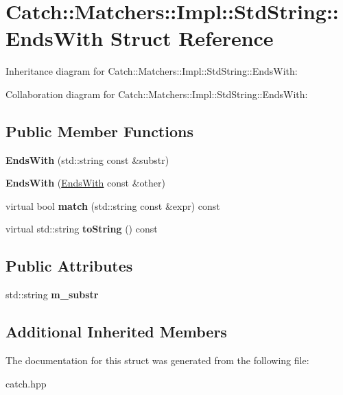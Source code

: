 \hypertarget{struct_catch_1_1_matchers_1_1_impl_1_1_std_string_1_1_ends_with}{}\section{Catch\+:\+:Matchers\+:\+:Impl\+:\+:Std\+String\+:\+:Ends\+With Struct Reference}
\label{struct_catch_1_1_matchers_1_1_impl_1_1_std_string_1_1_ends_with}


Inheritance diagram for Catch\+:\+:Matchers\+:\+:Impl\+:\+:Std\+String\+:\+:Ends\+With\+:


Collaboration diagram for Catch\+:\+:Matchers\+:\+:Impl\+:\+:Std\+String\+:\+:Ends\+With\+:
\subsection*{Public Member Functions}
\begin{DoxyCompactItemize}
\item 
\mbox{\label{struct_catch_1_1_matchers_1_1_impl_1_1_std_string_1_1_ends_with_a82730175f7f7475ce1ee9791e160d02d}} 
{\bfseries Ends\+With} (std\+::string const \&substr)
\item 
\mbox{\label{struct_catch_1_1_matchers_1_1_impl_1_1_std_string_1_1_ends_with_a9321aac07fb17613a7993e99003b3be2}} 
{\bfseries Ends\+With} (\hyperlink{struct_catch_1_1_matchers_1_1_impl_1_1_std_string_1_1_ends_with}{Ends\+With} const \&other)
\item 
\mbox{\label{struct_catch_1_1_matchers_1_1_impl_1_1_std_string_1_1_ends_with_aff66fb5af2d4f6161627cb20899b2c1b}} 
virtual bool {\bfseries match} (std\+::string const \&expr) const
\item 
\mbox{\label{struct_catch_1_1_matchers_1_1_impl_1_1_std_string_1_1_ends_with_a2a4675e3d2369d587af36f051fb7964f}} 
virtual std\+::string {\bfseries to\+String} () const
\end{DoxyCompactItemize}
\subsection*{Public Attributes}
\begin{DoxyCompactItemize}
\item 
\mbox{\label{struct_catch_1_1_matchers_1_1_impl_1_1_std_string_1_1_ends_with_a5abf70e94ea7893b7bd1e7b33880ba7b}} 
std\+::string {\bfseries m\+\_\+substr}
\end{DoxyCompactItemize}
\subsection*{Additional Inherited Members}


The documentation for this struct was generated from the following file\+:\begin{DoxyCompactItemize}
\item 
catch.\+hpp\end{DoxyCompactItemize}
